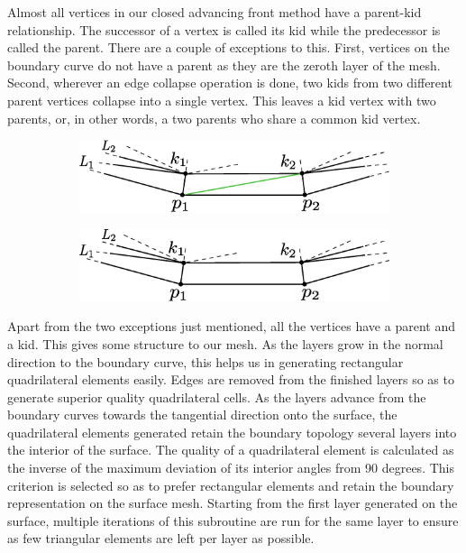 Almost all vertices in our closed advancing front method have a parent-kid relationship. The successor of a vertex is called its kid while the predecessor is called the parent. There are a couple of exceptions to this. First, vertices on the boundary curve do not have a parent as they are the zeroth layer of the mesh. Second, wherever an edge collapse operation is done, two kids from two different parent vertices collapse into a single vertex. This leaves a kid vertex with two parents, or, in other words, a two parents who share a common kid vertex.

\vspace{10pt}
\begin{figure}[hbt!]
\centering
\begin{subfigure}{\textwidth}
  \centering
  \includegraphics[width=.7\linewidth]{img/m2/combineTriToQuad.eps}
  \caption{}
  \label{triToQuad1}
\end{subfigure}
\begin{subfigure}{\textwidth}
  \centering
  \includegraphics[width=.7\linewidth]{img/m2/combineTriToQuad2.eps}
  \caption{}
  \label{triToQuad2}
\end{subfigure}
\caption{}
\label{triToQuad}
\end{figure}

Apart from the two exceptions just mentioned, all the vertices have a parent and a kid. This gives some structure to our mesh. As the layers grow in the normal direction to the boundary curve, this helps us in generating rectangular quadrilateral elements easily. Edges are removed from the finished layers so as to generate superior quality quadrilateral cells. As the layers advance from the boundary curves towards the tangential direction onto the surface, the quadrilateral elements generated retain the boundary topology several layers into the interior of the surface. The quality of a quadrilateral element is calculated as the inverse of the maximum deviation of its interior angles from 90 degrees. This criterion is selected so as to prefer rectangular elements and retain the boundary representation on the surface mesh. Starting from the first layer generated on the surface, multiple iterations of this subroutine are run for the same layer to ensure as few triangular elements are left per layer as possible.

